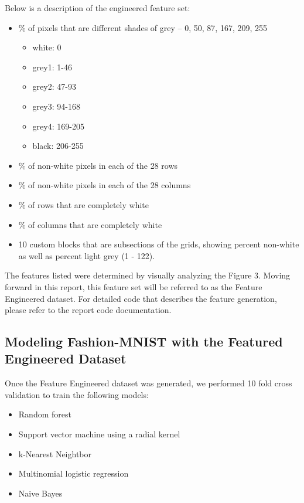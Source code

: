 \documentclass{article}
\begin{document}
Below is a description of the engineered feature set:

\begin{itemize}
\tightlist
\item
  \% of pixels that are different shades of grey -- 0, 50, 87, 167, 209,
  255

  \begin{itemize}
  \tightlist
  \item
    white: 0
  \item
    grey1: 1-46
  \item
    grey2: 47-93
  \item
    grey3: 94-168
  \item
    grey4: 169-205\\
  \item
    black: 206-255
  \end{itemize}
\item
  \% of non-white pixels in each of the 28 rows
\item
  \% of non-white pixels in each of the 28 columns
\item
  \% of rows that are completely white
\item
  \% of columns that are completely white
\item
  10 custom blocks that are subsections of the grids, showing percent
  non-white as well as percent light grey (1 - 122).
\end{itemize}

The features listed were determined by visually analyzing the Figure 3.
Moving forward in this report, this feature set will be referred to as
the Feature Engineered dataset. For detailed code that describes the
feature generation, please refer to the report code documentation.

\hypertarget{modeling-fashion-mnist-with-the-featured-engineered-dataset}{%
\subsection{Modeling Fashion-MNIST with the Featured Engineered
Dataset}\label{modeling-fashion-mnist-with-the-featured-engineered-dataset}}

Once the Feature Engineered dataset was generated, we performed 10 fold
cross validation to train the following models:

\begin{itemize}
\tightlist
\item
  Random forest
\item
  Support vector machine using a radial kernel
\item
  k-Nearest Neightbor
\item
  Multinomial logistic regression
\item
  Naive Bayes
\end{itemize}
\end{document}
